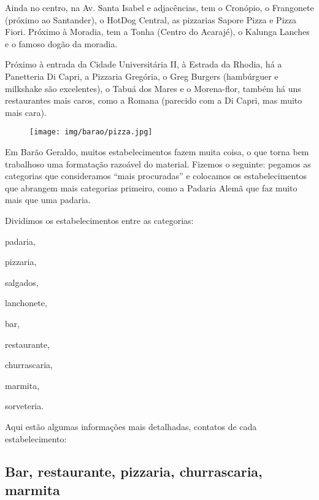 Ainda no centro, na Av. Santa Isabel e adjacências, tem o Cronópio, o
Frangonete (próximo ao Santander), o HotDog Central, as pizzarias Sapore Pizza
e Pizza Fiori. Próximo à Moradia, tem a Tonha (Centro do Acarajé), o Kalunga
Lanches e o famoso dogão da moradia.

Próximo à entrada da Cidade Universitária II, à Estrada da Rhodia, há a
Panetteria Di Capri, a Pizzaria Gregória, o Greg Burgers (hambúrguer e
milkshake são excelentes), o Tabuá dos Mares e o Morena-flor, também há uns
restaurantes mais caros, como a Romana (parecido com a Di Capri, mas muito mais
cara).\\

\begin{figure}[h!]
    \centering
    \texttt{[image: img/barao/pizza.jpg]}
\end{figure}

Em Barão Geraldo, muitos estabelecimentos fazem muita coisa, o que torna bem
trabalhoso uma formatação razoável do material. Fizemos o seguinte: pegamos as
categorias que consideramos ``mais procuradas'' e colocamos os estabelecimentos
que abrangem mais categorias primeiro, como a Padaria Alemã que faz muito mais
que uma padaria.

Dividimos os estabelecimentos entre as categorias:

\begin{itemize}[noitemsep]
\begin{multicols}{2}
\item padaria,
\item pizzaria,
\item salgados,
\item lanchonete,
\item bar,
\item restaurante,
\item churrascaria,
\item marmita,
\item sorveteria.
\end{multicols}
\end{itemize}

Aqui estão algumas informações mais detalhadas, contatos de cada
estabelecimento:

\subsection{Bar, restaurante, pizzaria, churrascaria, marmita}


